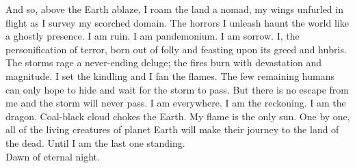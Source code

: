 And so, above the Earth ablaze, I roam the land a nomad, my wings unfurled in flight as I survey my scorched domain. The horrors I unleash haunt the world like a ghostly presence. I am ruin. I am pandemonium. I am sorrow. I, the personification of terror, born out of  folly and feasting upon its greed and hubris. The storms rage a never-ending deluge; the fires burn with devastation and magnitude. I set the kindling and I fan the flames. The few remaining humans can only hope to hide and wait for the storm to pass. But there is no escape from me and the storm will never pass. I am everywhere. I am the reckoning. I am the dragon. Coal-black cloud chokes the Earth. My flame is the only sun. One by one, all of the living creatures of planet Earth will make their journey to the land of the dead. Until I am the last one standing. \\

Dawn of eternal night. \\

